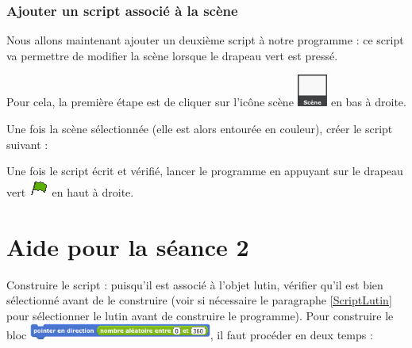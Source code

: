 \subsubsection{Ajouter un script associé à la scène}

Nous allons maintenant ajouter un deuxième script à notre programme : ce script va permettre de modifier la scène lorsque le drapeau vert est pressé. 

Pour cela, la première étape est de cliquer sur l'icône scène \includegraphics[width=1cm]{./images/scratch/Scene} en bas à droite.


Une fois la scène sélectionnée (elle est alors entourée en couleur), créer le script suivant :


Une fois le script écrit et vérifié, lancer le programme en appuyant sur le drapeau vert \includegraphics[width=.7cm]{./images/scratch/DrapeauVert} en haut à droite. 








%
%
%
%









\section{Aide pour la séance 2}\label{correction_scratch2}


Construire le script : puisqu'il est associé à l'objet lutin, vérifier qu'il est bien sélectionné avant de le construire (voir si nécessaire le paragraphe \vref{ScriptLutin} pour sélectionner le lutin avant de construire le programme). Pour construire le bloc \includegraphics[width=6cm]{./images/scratch/ScratchActivite23}, il faut procéder en deux temps :

